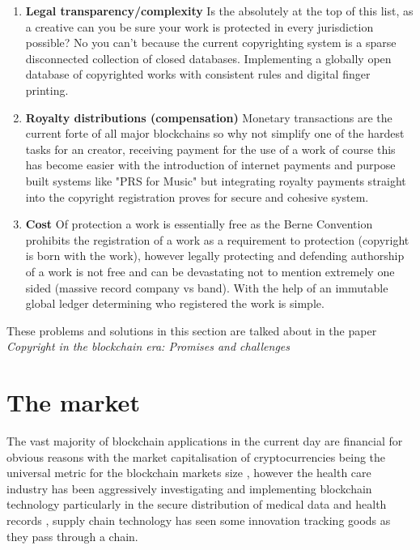 \documentclass[12pt]{report}
\begin{document}
\begin{enumerate}
	\item \textbf{Legal transparency/complexity} Is the absolutely at the top of this list, as a creative can you be sure your work is protected in every jurisdiction possible? No you can't because the current copyrighting system is a sparse disconnected collection of closed databases. Implementing a globally open database of copyrighted works with consistent rules and digital finger printing. 
	\item \textbf{Royalty distributions (compensation)} Monetary transactions are the current forte of all major blockchains so why not simplify one of the hardest tasks for an creator, receiving payment for the use of a work of course this has become easier with the introduction of internet payments and purpose built systems like "PRS for Music" but integrating royalty payments straight into the copyright registration proves for secure and cohesive system.
	\item \textbf{Cost} Of protection a work is essentially free as the Berne Convention prohibits the registration of a work as a requirement to protection (copyright is born with the work), however legally protecting and defending authorship of a work is not free and can be devastating not to mention extremely one sided (massive record company vs band). With the help of an immutable global ledger determining who registered the work is simple. %
\end{enumerate}

These problems and solutions in this section are talked about in the paper \textit{Copyright in the blockchain era: Promises and challenges} \cite{Copyright_in_the_blockchain_era}


\section{The market}

The vast majority of blockchain applications in the current day are financial for obvious reasons with the market capitalisation of cryptocurrencies being the universal metric for the blockchain markets size \cite{wood_2021}, however the health care industry has been aggressively investigating and implementing blockchain technology particularly in the secure distribution of medical data and health records \cite{8167115}, supply chain technology has seen some innovation tracking goods as they pass through a chain. 
\end{document}
